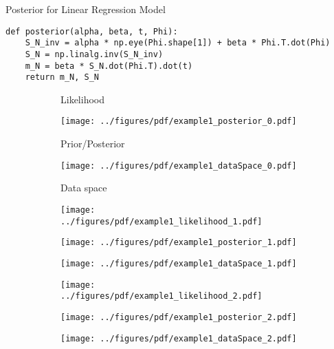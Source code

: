 \documentclass[a4paper,10pt]{article}
\begin{document}
\begin{algorithm}[H]  
  \caption{Posterior for Linear Regression Model}
  \label{alg:posterior_for_linear_regression_model}
\begin{lstlisting}
def posterior(alpha, beta, t, Phi):
    S_N_inv = alpha * np.eye(Phi.shape[1]) + beta * Phi.T.dot(Phi)
    S_N = np.linalg.inv(S_N_inv)
    m_N = beta * S_N.dot(Phi.T).dot(t)
    return m_N, S_N
\end{lstlisting}
\end{algorithm}

\begin{figure}[H]

\begin{subfigure}[t]{0.32\textwidth} 
\caption*{Likelihood} 
\end{subfigure}
\begin{subfigure}[t]{0.32\textwidth}
\caption*{Prior/Posterior} 
\texttt{[image: ../figures/pdf/example1\_posterior\_0.pdf]} 
\end{subfigure}
\begin{subfigure}[t]{0.32\textwidth}
\caption*{Data space} 
\texttt{[image: ../figures/pdf/example1\_dataSpace\_0.pdf]} 
\end{subfigure}


\begin{subfigure}[c]{0.32\textwidth}
\texttt{[image: ../figures/pdf/example1\_likelihood\_1.pdf]} 
\end{subfigure}
\begin{subfigure}[c]{0.32\textwidth}
\texttt{[image: ../figures/pdf/example1\_posterior\_1.pdf]} 
\end{subfigure}
\begin{subfigure}[c]{0.32\textwidth}
\texttt{[image: ../figures/pdf/example1\_dataSpace\_1.pdf]} 
\end{subfigure}

\begin{subfigure}[c]{0.32\textwidth}
\texttt{[image: ../figures/pdf/example1\_likelihood\_2.pdf]} 
\end{subfigure}
\begin{subfigure}[c]{0.32\textwidth}
\texttt{[image: ../figures/pdf/example1\_posterior\_2.pdf]} 
\end{subfigure}
\begin{subfigure}[c]{0.32\textwidth}
\texttt{[image: ../figures/pdf/example1\_dataSpace\_2.pdf]} 
\end{subfigure}


\end{figure}
\end{document}
